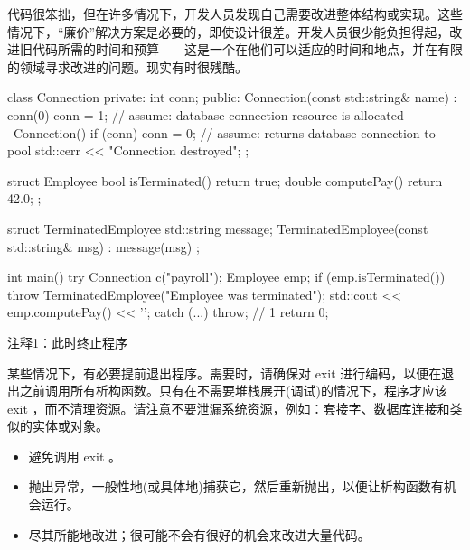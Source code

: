 代码很笨拙，但在许多情况下，开发人员发现自己需要改进整体结构或实现。这些情况下，“廉价”解决方案是必要的，即使设计很差。开发人员很少能负担得起，改进旧代码所需的时间和预算——这是一个在他们可以适应的时间和地点，并在有限的领域寻求改进的问题。现实有时很残酷。


\begin{cpp}
class Connection {
private:
  int conn;
public:
  Connection(const std::string& name) : conn(0) {
    conn = 1; // assume: database connection resource is allocated
  }
  ~Connection() {
    if (conn)
      conn = 0; // assume: returns database connection to pool
    std::cerr << "Connection destroyed\n";
  }
};

struct Employee {
  bool isTerminated() { return true; }
  double computePay() { return 42.0; }
};

struct TerminatedEmployee {
  std::string message;
  TerminatedEmployee(const std::string& msg) : message(msg) {}
};

int main() {
  try {
    Connection c("payroll");
    Employee emp;
    if (emp.isTerminated())
    throw TerminatedEmployee("Employee was terminated");
    std::cout << emp.computePay() << '\n';
  } catch (...) {
    throw; // 1
  }
  return 0;
}
\end{cpp}

{\footnotesize
注释1：此时终止程序
}

某些情况下，有必要提前退出程序。需要时，请确保对 exit 进行编码，以便在退出之前调用所有析构函数。只有在不需要堆栈展开(调试)的情况下，程序才应该 exit ，而不清理资源。请注意不要泄漏系统资源，例如：套接字、数据库连接和类似的实体或对象。


\begin{itemize}
\item
避免调用 exit 。

\item
抛出异常，一般性地(或具体地)捕获它，然后重新抛出，以便让析构函数有机会运行。

\item
尽其所能地改进；很可能不会有很好的机会来改进大量代码。
\end{itemize}









